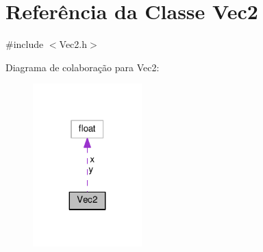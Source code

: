 \hypertarget{classVec2}{\section{Referência da Classe Vec2}
\label{classVec2}
}


{\ttfamily \#include $<$Vec2.\+h$>$}



Diagrama de colaboração para Vec2\+:\nopagebreak
\begin{figure}[H]
\begin{center}
\leavevmode
\includegraphics[width=119pt]{classVec2__coll__graph}
\end{center}
\end{figure}
